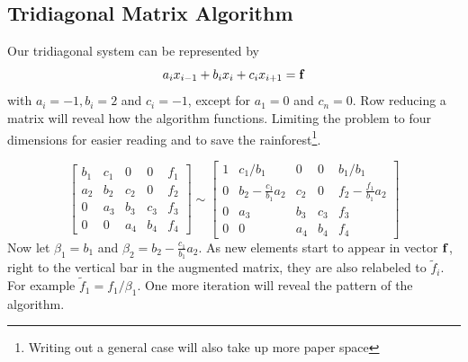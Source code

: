 \documentclass[10pt, a4paper]{amsart}
\begin{document}
\subsection{Tridiagonal Matrix Algorithm}
Our tridiagonal system can be represented by 
\begin{equation}
a_ix_{i-1} + b_ix_i + c_ix_{i+1} = \vb{f}
\end{equation}
with $a_i=-1,b_i=2$ and $c_i=-1$, except for $a_1=0$ and $c_n=0$. Row
reducing a matrix will reveal how the algorithm functions. Limiting
the problem to four dimensions for easier reading and to save the
rainforest\footnote{Writing out a general case will also take up more paper
space}.

\begin{equation}
\left[
\begin{array}{cccc|c}
b_1 & c_1 & 0 & 0 & f_1 \\
a_2 & b_2 & c_2 & 0  & f_2 \\
0 & a_3 & b_3 & c_3 & f_3 \\
0 & 0 & a_4 & b_4 & f_4
\end{array}
\right] \sim
\left[
\begin{array}{cccc|c}
1 & c_1/b_1 & 0 & 0 & b_1/b_1 \\
0 & b_2-\frac{c_1}{b_1}a_2 & c_2 & 0  & f_2-\frac{f_1}{b_1}a_2 \\
0 & a_3 & b_3 & c_3 & f_3 \\
0 & 0 & a_4 & b_4 & f_4
\end{array}
\right]
\end{equation}
Now let $\beta_1=b_1$ and $\beta_2=b_2-\frac{c_1}{b_1}a_2$. As new
elements start to appear in vector $\vb{f}$, right to the vertical bar
in the augmented matrix, they are also relabeled to $\tilde{f}_i$. For
example $\tilde{f}_1=f_1/\beta_1$. One more iteration will reveal the
pattern of the algorithm.
\end{document}
